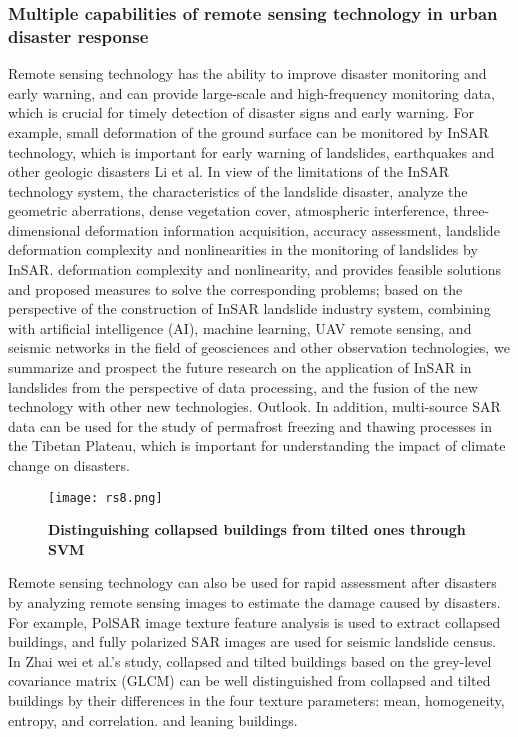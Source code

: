 \documentclass[conference]{IEEEtran}
\begin{document}
\subsubsection{Multiple capabilities of remote sensing technology in urban disaster response}
Remote sensing technology has the ability to improve disaster monitoring and early warning, and can provide large-scale and high-frequency monitoring data, which is crucial for timely detection of disaster signs and early warning.  For example, small deformation of the ground surface can be monitored by InSAR technology, which is important for early warning of landslides, earthquakes and other geologic disasters Li et al.\cite{b70} In view of the limitations of the InSAR technology system, the characteristics of the landslide disaster, analyze the geometric aberrations, dense vegetation cover, atmospheric interference, three-dimensional deformation information acquisition, accuracy assessment, landslide deformation complexity and nonlinearities in the monitoring of landslides by InSAR. deformation complexity and nonlinearity, and provides feasible solutions and proposed measures to solve the corresponding problems; based on the perspective of the construction of InSAR landslide industry system, combining with artificial intelligence (AI), machine learning, UAV remote sensing, and seismic networks in the field of geosciences and other observation technologies, we summarize and prospect the future research on the application of InSAR in landslides from the perspective of data processing, and the fusion of the new technology with other new technologies. Outlook. In addition, multi-source SAR data can be used for the study of permafrost freezing and thawing processes in the Tibetan Plateau, which is important for understanding the impact of climate change on disasters.

\begin{figure}[h]
    \centering
    \texttt{[image: rs8.png]}
    \caption{\textbf{Distinguishing collapsed buildings from tilted ones through SVM}}
    \label{fig:enter-label}
\end{figure}

Remote sensing technology can also be used for rapid assessment after disasters by analyzing remote sensing images to estimate the damage caused by disasters. For example, PolSAR image texture feature analysis is used to extract collapsed buildings, and fully polarized SAR images are used for seismic landslide census. In Zhai wei et al.'s study\cite{b71}, collapsed and tilted buildings based on the grey-level covariance matrix (GLCM) can be well distinguished from collapsed and tilted buildings by their differences in the four texture parameters: mean, homogeneity, entropy, and correlation. and leaning buildings. 
\end{document}
